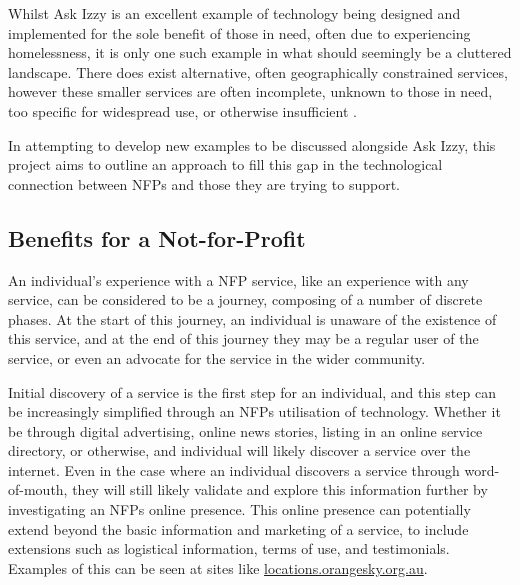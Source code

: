 Whilst Ask Izzy is an excellent example of technology being designed and implemented for the sole benefit of those in need, often due to experiencing homelessness, it is only one such example in what should seemingly be a cluttered landscape. There does exist alternative, often geographically constrained services, however these smaller services are often incomplete, unknown to those in need, too specific for widespread use, or otherwise insufficient \cite{gough2013improving} \cite{gough2016designing}.

In attempting to develop new examples to be discussed alongside Ask Izzy, this project aims to outline an approach to fill this gap in the technological connection between NFPs and those they are trying to support.

\subsection{Benefits for a Not-for-Profit}

An individual's experience with a NFP service, like an experience with any service, can be considered to be a journey, composing of a number of discrete phases. At the start of this journey, an individual is unaware of the existence of this service, and at the end of this journey they may be a regular user of the service, or even an advocate for the service in the wider community.

Initial discovery of a service is the first step for an individual, and this step can be increasingly simplified through an NFPs utilisation of technology. Whether it be through digital advertising, online news stories, listing in an online service directory, or otherwise, and individual will likely discover a service over the internet. Even in the case where an individual discovers a service through word-of-mouth, they will still likely validate and explore this information further by investigating an NFPs online presence. This online presence can potentially extend beyond the basic information and marketing of a service, to include extensions such as logistical information, terms of use, and testimonials. Examples of this can be seen at sites like \url{locations.orangesky.org.au}.

